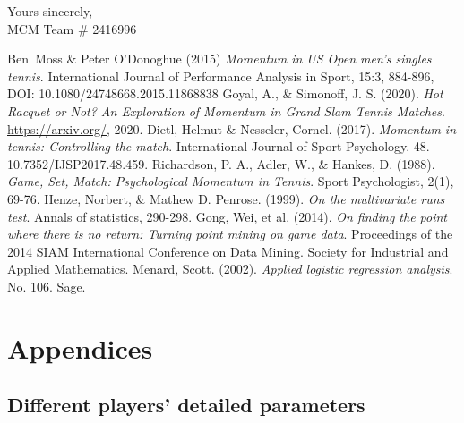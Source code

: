 \documentclass[UTF8]{ctexart} %
\begin{document}
\begin{flushright}
    Yours sincerely,\\
    MCM Team \# 2416996
\end{flushright}


\begin{thebibliography}{99} %
     Ben Moss \& Peter O'Donoghue (2015) \textit{Momentum in US Open men's singles tennis}. International Journal of Performance Analysis in Sport, 15:3, 884-896, DOI: 10.1080/24748668.2015.11868838
     Goyal, A., \& Simonoff, J. S. (2020). \textit{Hot Racquet or Not? An Exploration of Momentum in Grand Slam Tennis Matches}. \url{https://arxiv.org/}, 2020.  
     Dietl, Helmut \& Nesseler, Cornel. (2017). \textit{Momentum in tennis: Controlling the match}. International Journal of Sport Psychology. 48. 10.7352/IJSP2017.48.459. 
     Richardson, P. A., Adler, W., \& Hankes, D. (1988). \textit{Game, Set, Match: Psychological Momentum in Tennis}. Sport Psychologist, 2(1), 69-76.
     Henze, Norbert, \& Mathew D. Penrose. (1999). \textit{On the multivariate runs test}. Annals of statistics, 290-298.
     Gong, Wei, et al. (2014). \textit{On finding the point where there is no return: Turning point mining on game data}. Proceedings of the 2014 SIAM International Conference on Data Mining. Society for Industrial and Applied Mathematics.
     Menard, Scott. (2002). \textit{Applied logistic regression analysis}. No. 106. Sage.
\end{thebibliography}


\newpage
\vspace*{-12ex}
\section*{Appendices}
\subsection*{Different players' detailed parameters}
\end{document}
